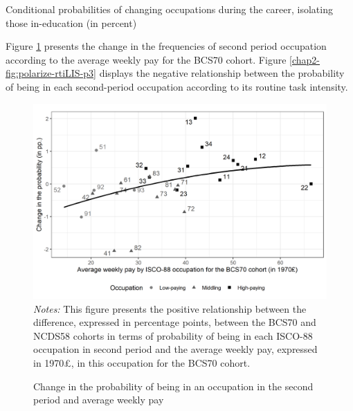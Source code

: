\begin{table}[!htb]
    \centering
    \caption{Conditional probabilities of changing occupations during the career, isolating those in-education (in percent)}
    \label{chap2-tab:proba-group5-cdt-short}
\end{table}

Figure \ref{chap2-fig:polarize-isco88-pay-p3} presents the change in the frequencies of second period occupation according to the average weekly pay for the BCS70 cohort. 
Figure \ref{chap2-fig:polarize-rtiLIS-p3} displays the negative relationship between the probability of being in each second-period occupation according to its routine task intensity.

\begin{figure}[!htb]
    \centering
    \caption{Change in the probability of being in an occupation in the second period and average weekly pay}
    \label{chap2-fig:polarize-isco88-pay-p3}
    \includegraphics[width=\linewidth]{chap2/graphic/polarize-BCSpay-p3.png}
	\vspace{-3em}
	\justify\singlespacing\footnotesize{\textit{Notes:} This figure presents the positive relationship between the difference, expressed in percentage points, between the BCS70 and NCDS58 cohorts in terms of probability of being in each ISCO-88 occupation in second period and the average weekly pay, expressed in 1970£, in this occupation for the BCS70 cohort.}
\end{figure}

